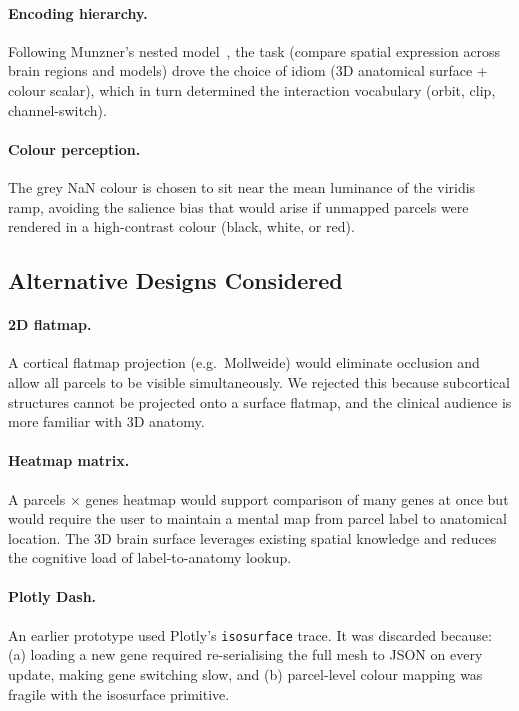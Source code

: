\documentclass[11pt,letterpaper]{article}
\begin{document}
\paragraph{Encoding hierarchy.}
Following Munzner's nested model~\citep{munzner2014}, the task
(compare spatial expression across brain regions and models)
drove the choice of idiom (3D anatomical surface + colour scalar),
which in turn determined the interaction vocabulary (orbit, clip,
channel-switch).

\paragraph{Colour perception.}
The grey NaN colour is chosen to sit near the mean luminance of the
viridis ramp, avoiding the salience bias that would arise if unmapped
parcels were rendered in a high-contrast colour (black, white, or red).

\subsection{Alternative Designs Considered}

\paragraph{2D flatmap.}
A cortical flatmap projection (e.g.\ Mollweide) would eliminate
occlusion and allow all parcels to be visible simultaneously.
We rejected this because subcortical structures cannot be projected
onto a surface flatmap, and the clinical audience is more familiar
with 3D anatomy.

\paragraph{Heatmap matrix.}
A parcels $\times$ genes heatmap would support comparison of many
genes at once but would require the user to maintain a mental map
from parcel label to anatomical location.
The 3D brain surface leverages existing spatial knowledge and reduces
the cognitive load of label-to-anatomy lookup.

\paragraph{Plotly Dash.}
An earlier prototype used Plotly's \texttt{isosurface} trace.
It was discarded because: (a) loading a new gene required re-serialising
the full mesh to JSON on every update, making gene switching slow, and
(b) parcel-level colour mapping was fragile with the isosurface primitive.
\end{document}
